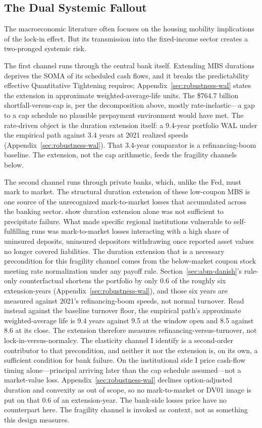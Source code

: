 \documentclass[12pt]{article}
\begin{document}
\subsection{The Dual Systemic Fallout}\label{sec:discussion-fallout}

The macroeconomic literature often focuses on the housing mobility implications of the lock-in effect. But its transmission into the fixed-income sector creates a two-pronged systemic risk.

The first channel runs through the central bank itself. Extending MBS durations deprives the SOMA of its scheduled cash flows, and it breaks the predictability effective Quantitative Tightening requires; Appendix~\ref{sec:robustness-wal} states the extension in approximate weighted-average-life units. The \$764.7 billion shortfall-versus-cap is, per the decomposition above, mostly rate-inelastic---a gap to a cap schedule no plausible prepayment environment would have met. The rate-driven object is the duration extension itself: a 9.4-year portfolio WAL under the empirical path against 3.4 years at 2021 realized speeds (Appendix~\ref{sec:robustness-wal}). That 3.4-year comparator is a refinancing-boom baseline. The extension, not the cap arithmetic, feeds the fragility channels below.

The second channel runs through private banks, which, unlike the Fed, must mark to market. The structural duration extension of these low-coupon MBS is one source of the unrecognized mark-to-market losses that accumulated across the banking sector. \citet{jiang2023} show duration extension alone was not sufficient to precipitate failure. What made specific regional institutions vulnerable to self-fulfilling runs was mark-to-market losses interacting with a high share of uninsured deposits, uninsured depositors withdrawing once reported asset values no longer covered liabilities. The duration extension that is a necessary precondition for this fragility channel comes from the below-market coupon stock meeting rate normalization under any payoff rule. Section~\ref{sec:abm-danish}'s rule-only counterfactual shortens the portfolio by only 0.6 of the roughly six extension-years (Appendix~\ref{sec:robustness-wal}), and those six years are measured against 2021's refinancing-boom speeds, not normal turnover. Read instead against the baseline turnover floor, the empirical path's approximate weighted-average life is 9.4 years against 9.5 at the window open and 8.5 against 8.6 at its close. The extension therefore measures refinancing-versus-turnover, not lock-in-versus-normalcy. The elasticity channel I identify is a second-order contributor to that precondition, and neither it nor the extension is, on its own, a sufficient condition for bank failure. On the institutional side I price cash-flow timing alone---principal arriving later than the cap schedule assumed---not a market-value loss. Appendix~\ref{sec:robustness-wal} declines option-adjusted duration and convexity as out of scope, so no mark-to-market or DV01 image is put on that 0.6 of an extension-year. The bank-side losses \citet{jiang2023} price have no counterpart here. The fragility channel is invoked as context, not as something this design measures.
\end{document}
